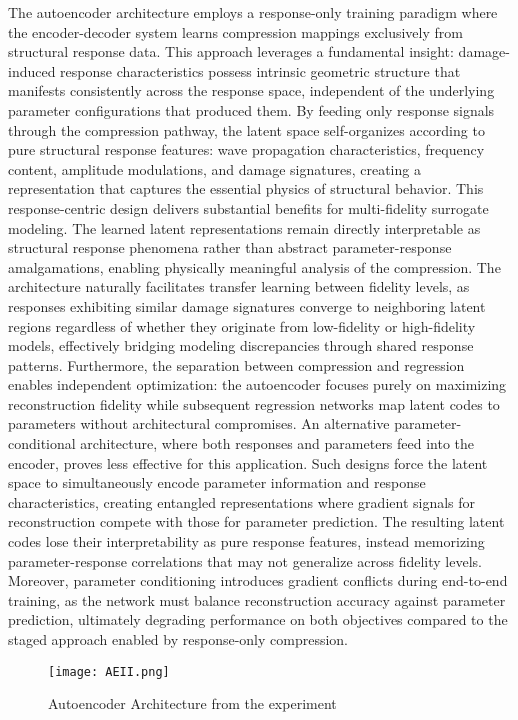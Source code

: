 \documentclass[12pt,a4paper]{report}
\begin{document}
The autoencoder architecture employs a response-only training paradigm where the encoder-decoder system learns compression mappings exclusively from structural response data. This approach leverages a fundamental insight: damage-induced response characteristics possess intrinsic geometric structure that manifests consistently across the response space, independent of the underlying parameter configurations that produced them. By feeding only response signals through the compression pathway, the latent space self-organizes according to pure structural response features: wave propagation characteristics, frequency content, amplitude modulations, and damage signatures, creating a representation that captures the essential physics of structural behavior.
This response-centric design delivers substantial benefits for multi-fidelity surrogate modeling. The learned latent representations remain directly interpretable as structural response phenomena rather than abstract parameter-response amalgamations, enabling physically meaningful analysis of the compression. The architecture naturally facilitates transfer learning between fidelity levels, as responses exhibiting similar damage signatures converge to neighboring latent regions regardless of whether they originate from low-fidelity or high-fidelity models, effectively bridging modeling discrepancies through shared response patterns. Furthermore, the separation between compression and regression enables independent optimization: the autoencoder focuses purely on maximizing reconstruction fidelity while subsequent regression networks map latent codes to parameters without architectural compromises.
An alternative parameter-conditional architecture, where both responses and parameters feed into the encoder, proves less effective for this application. Such designs force the latent space to simultaneously encode parameter information and response characteristics, creating entangled representations where gradient signals for reconstruction compete with those for parameter prediction. The resulting latent codes lose their interpretability as pure response features, instead memorizing parameter-response correlations that may not generalize across fidelity levels. Moreover, parameter conditioning introduces gradient conflicts during end-to-end training, as the network must balance reconstruction accuracy against parameter prediction, ultimately degrading performance on both objectives compared to the staged approach enabled by response-only compression.

\begin{figure}[htbp]
\centering
\texttt{[image: AEII.png]}
\caption{Autoencoder Architecture from the experiment}
\label{fig:autoencoder_architecture}
\end{figure}
\end{document}
